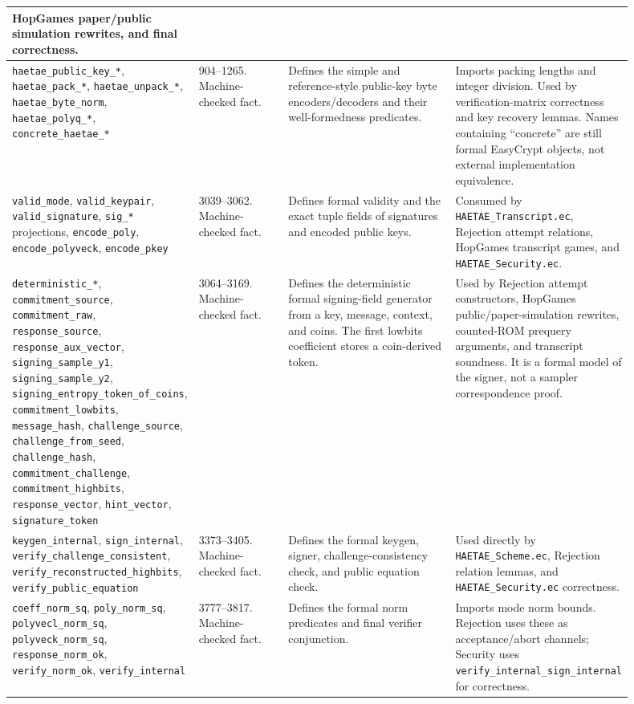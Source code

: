 \documentclass[11pt]{report}
\DeclareRobustCommand{\file}[1]{\ifmmode\text{\nolinkurl{#1}}\else\nolinkurl{#1}\fi}
\DeclareRobustCommand{\ec}[1]{\ifmmode\text{\nolinkurl{#1}}\else\nolinkurl{#1}\fi}
\theoremstyle{definition}
\theoremstyle{plain}
\begin{document}
{\begin{longtable}{p{0.24\linewidth}p{0.15\linewidth}p{0.28\linewidth}p{0.23\linewidth}}
HopGames paper/public simulation rewrites, and final correctness. \\
\midrule
\ec{haetae\_public\_key\_*}, \ec{haetae\_pack\_*},
\ec{haetae\_unpack\_*}, \ec{haetae\_byte\_norm},
\ec{haetae\_polyq\_*}, \ec{concrete\_haetae\_*} &
904--1265. Machine-checked fact. &
Defines the simple and reference-style public-key byte encoders/decoders and
their well-formedness predicates. &
Imports packing lengths and integer division.  Used by verification-matrix
correctness and key recovery lemmas.  Names containing ``concrete'' are still
formal EasyCrypt objects, not external implementation equivalence. \\
\midrule
\ec{valid\_mode}, \ec{valid\_keypair}, \ec{valid\_signature},
\ec{sig\_*} projections, \ec{encode\_poly}, \ec{encode\_polyveck},
\ec{encode\_pkey} &
3039--3062. Machine-checked fact. &
Defines formal validity and the exact tuple fields of signatures and encoded
public keys. &
Consumed by \file{HAETAE\_Transcript.ec}, Rejection attempt relations, HopGames
transcript games, and \file{HAETAE\_Security.ec}. \\
\midrule
\ec{deterministic\_*}, \ec{commitment\_source}, \ec{commitment\_raw},
\ec{response\_source}, \ec{response\_aux\_vector},
\ec{signing\_sample\_y1}, \ec{signing\_sample\_y2},
\ec{signing\_entropy\_token\_of\_coins}, \ec{commitment\_lowbits},
\ec{message\_hash}, \ec{challenge\_source}, \ec{challenge\_from\_seed},
\ec{challenge\_hash}, \ec{commitment\_challenge},
\ec{commitment\_highbits}, \ec{response\_vector}, \ec{hint\_vector},
\ec{signature\_token} &
3064--3169. Machine-checked fact. &
Defines the deterministic formal signing-field generator from a key, message,
context, and coins.  The first lowbits coefficient stores a coin-derived token. &
Used by Rejection attempt constructors, HopGames public/paper-simulation
rewrites, counted-ROM prequery arguments, and transcript soundness.  It is a
formal model of the signer, not a sampler correspondence proof. \\
\midrule
\ec{keygen\_internal}, \ec{sign\_internal},
\ec{verify\_challenge\_consistent},
\ec{verify\_reconstructed\_highbits}, \ec{verify\_public\_equation} &
3373--3405. Machine-checked fact. &
Defines the formal keygen, signer, challenge-consistency check, and public
equation check. &
Used directly by \file{HAETAE\_Scheme.ec}, Rejection relation lemmas, and
\file{HAETAE\_Security.ec} correctness. \\
\midrule
\ec{coeff\_norm\_sq}, \ec{poly\_norm\_sq}, \ec{polyvecl\_norm\_sq},
\ec{polyveck\_norm\_sq}, \ec{response\_norm\_ok},
\ec{verify\_norm\_ok}, \ec{verify\_internal} &
3777--3817. Machine-checked fact. &
Defines the formal norm predicates and final verifier conjunction. &
Imports mode norm bounds.  Rejection uses these as acceptance/abort channels;
Security uses \ec{verify\_internal\_sign\_internal} for correctness. \\
\bottomrule
\end{longtable}
}
\end{document}
